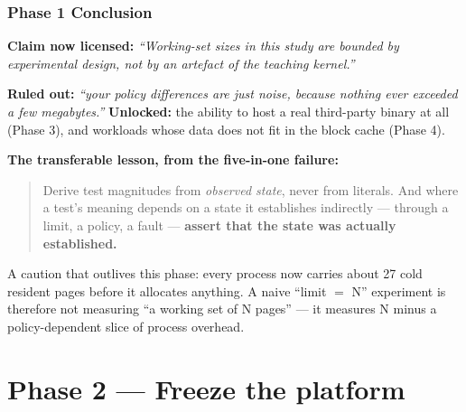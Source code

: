 \documentclass[10pt,aspectratio=169]{beamer}
\newcommand{\good}[1]{\textcolor{good}{#1}}
\newcommand{\warn}[1]{\textcolor{warn}{#1}}
\newcommand{\phasehead}[2]{%
  \frametitle{#1 \quad\small\normalfont\textcolor{white!75!accent}{#2}}}
\begin{document}
\begin{frame}
  \phasehead{Phase 1}{Conclusion}
  \small
  \textbf{\good{Claim now licensed:}} \emph{``Working-set sizes in this study
  are bounded by experimental design, not by an artefact of the teaching
  kernel.''}

  \medskip
  \textbf{Ruled out:} \emph{``your policy differences are just noise, because
  nothing ever exceeded a few megabytes.''}
  \quad\textbf{Unlocked:} the ability to host a real third-party binary at all
  (Phase 3), and workloads whose data does not fit in the block cache
  (Phase 4).

  \medskip
  \textbf{The transferable lesson, from the five-in-one failure:}
  \begin{quote}
    Derive test magnitudes from \emph{observed state}, never from literals.
    And where a test's meaning depends on a state it establishes indirectly
    --- through a limit, a policy, a fault --- \textbf{assert that the state was
    actually established.}
  \end{quote}

  \medskip
  \warn{A caution that outlives this phase:} every process now carries about
  27 cold resident pages before it allocates anything. A naive
  ``limit $=$ N'' experiment is therefore not measuring ``a working set of N
  pages'' --- it measures N minus a policy-dependent slice of process overhead.
\end{frame}


\section{Phase 2 --- Freeze the platform}
\end{document}
